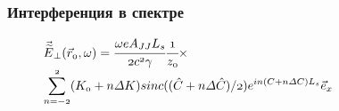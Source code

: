 \documentclass[14pt, hyperref = {colorlinks},xcolor=table ]{beamer}
\begin{document}
\small
\begin{frame}
\frametitle{Интерференция в спектре}\label{t1}
\vspace{-5pt}
\begin{figure}[h]
	\begin{minipage}[h]{0.49\linewidth}
		\vspace{-10pt}
	\end{minipage}
	\begin{minipage}[h]{0.49\linewidth}
	\end{minipage}

\end{figure}
\vspace{-20pt}
\begin{figure}[h]
	$\mathnormal{\vec{\widetilde{E}}_{\bot}(\vec{r}_{0}, \omega) =
	\cfrac{\omega eA_{JJ} L_s}{2c^2 \gamma}\cfrac{1}{z_0} \times}$
	\\
	$\mathnormal{\displaystyle\sum\limits_{n =-2}^{2}(K_0 + n\Delta K)
	sinc((\hat{C} + n\Delta \hat{C})/2)e^{in({C} + n\Delta {C})L_s}	\vec{e}_x}$
\end{figure}
\end{frame}
\end{document}
